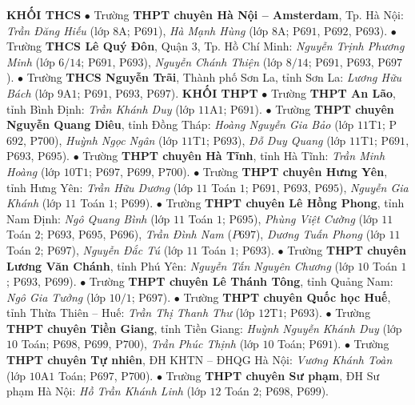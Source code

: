 \begin{multicols}{2}
	\textbf{\color{thachthuctoanhoc}KHỐI THCS}
	\vskip 0.05cm
	$\bullet$  Trường \textbf{\color{thachthuctoanhoc}THPT chuyên Hà Nội -- Amsterdam}, Tp. Hà Nội: \textit{Trần Đăng Hiếu} (lớp $8$A; P$691$), \textit{Hà Mạnh Hùng} (lớp $8$A; P$691$, P$692$, P$693$).
	\vskip 0.05cm
	$\bullet$  Trường \textbf{\color{thachthuctoanhoc}THCS Lê Quý Đôn}, Quận $3$, Tp. Hồ Chí Minh: \textit{Nguyễn Trịnh Phương Minh} (lớp $6/14$; P$691$, P$693$), \textit{Nguyễn Chánh Thiện} (lớp $8/14$; P$691$, P$693$, P$697$).
	\vskip 0.05cm
	$\bullet$  Trường \textbf{\color{thachthuctoanhoc}THCS Nguyễn Trãi}, Thành phố Sơn La, tỉnh Sơn La: \textit{Lương Hữu Bách} (lớp $9$A$1$; P$691$, P$693$, P$697$).
	\vskip 0.05cm
	\textbf{\color{thachthuctoanhoc}KHỐI THPT}
	\vskip 0.05cm
	$\bullet$  Trường \textbf{\color{thachthuctoanhoc}THPT An Lão}, tỉnh Bình Định: \textit{Trần Khánh Duy} (lớp $11$A$1$; P$691$).
	\vskip 0.05cm
	$\bullet$  Trường \textbf{\color{thachthuctoanhoc}THPT chuyên Nguyễn Quang Diêu}, tỉnh Đồng Tháp: \textit{Hoàng Nguyễn Gia Bảo} (lớp $11$T$1$; P$692$, P$700$), \textit{Huỳnh Ngọc Ngân} (lớp $11$T$1$; P$693$), \textit{Đỗ Duy Quang} (lớp $11$T$1$; P$691$, P$693$, P$695$).
	\vskip 0.05cm
	$\bullet$  Trường \textbf{\color{thachthuctoanhoc}THPT chuyên Hà Tĩnh}, tỉnh Hà Tĩnh: \textit{Trần Minh Hoàng} (lớp $10$T$1$; P$697$, P$699$, P$700$).
	\vskip 0.05cm
	$\bullet$  Trường \textbf{\color{thachthuctoanhoc}THPT chuyên Hưng Yên}, tỉnh Hưng Yên: \textit{Trần Hữu Dương} (lớp $11$ Toán $1$; P$691$, P$693$, P$695$), \textit{Nguyễn Gia Khánh} (lớp $11$ Toán $1$; P$699$).
	\vskip 0.05cm
	$\bullet$  Trường \textbf{\color{thachthuctoanhoc}THPT chuyên Lê Hồng Phong}, tỉnh Nam Định: \textit{Ngô Quang Bình} (lớp $11$ Toán $1$; P$695$), \textit{Phùng Việt Cường} (lớp $11$ Toán $2$; P$693$, P$695$, P$696$), \textit{Trần Đình Nam} ($P697$), \textit{Dương Tuấn Phong} (lớp $11$ Toán $2$; P$697$), \textit{Nguyễn Đắc Tú} (lớp $11$ Toán $1$; P$693$).
	\vskip 0.05cm
	$\bullet$  Trường \textbf{\color{thachthuctoanhoc}THPT chuyên Lương Văn Chánh}, tỉnh Phú Yên: \textit{Nguyễn Tấn Nguyên Chương} (lớp $10$ Toán $1$; P$693$, P$699$).
	\vskip 0.05cm
	$\bullet$  Trường \textbf{\color{thachthuctoanhoc}THPT chuyên Lê Thánh Tông}, tỉnh Quảng Nam: \textit{Ngô Gia Tưởng} (lớp $10/1$; P$697$).
	\vskip 0.05cm
	$\bullet$  Trường \textbf{\color{thachthuctoanhoc}THPT chuyên Quốc học Huế}, tỉnh Thừa Thiên -- Huế: \textit{Trần Thị Thanh Thư} (lớp $12$T$1$; P$693$).
	\vskip 0.05cm
	$\bullet$  Trường \textbf{\color{thachthuctoanhoc}THPT chuyên Tiền Giang}, tỉnh Tiền Giang: \textit{Huỳnh Nguyễn Khánh Duy} (lớp $10$ Toán; P$698$, P$699$, P$700$), \textit{Trần Phúc Thịnh} (lớp $10$ Toán; P$691$).
	\vskip 0.05cm
	$\bullet$  Trường \textbf{\color{thachthuctoanhoc}THPT chuyên Tự nhiên}, ĐH KHTN -- ĐHQG Hà Nội: \textit{Vương Khánh Toàn} (lớp $10$A$1$ Toán; P$697$, P$700$).
	\vskip 0.05cm
	$\bullet$  Trường \textbf{\color{thachthuctoanhoc}THPT chuyên Sư phạm}, ĐH Sư phạm Hà Nội: \textit{Hồ Trần Khánh Linh} (lớp $12$ Toán $2$; P$698$, P$699$).
\end{multicols}
